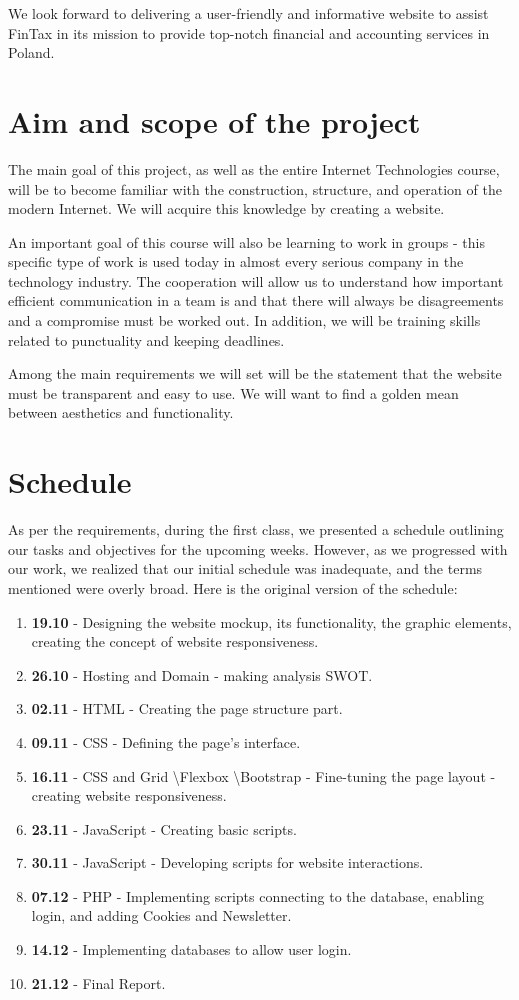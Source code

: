 \documentclass{article}
\begin{document}
We look forward to delivering a user-friendly and informative website to assist FinTax in its mission to provide top-notch financial and accounting services in Poland.
    
    \section{Aim and scope of the project}
The main goal of this project, as well as the entire Internet Technologies course, will be to become familiar with the construction, structure, and operation of the modern Internet. We will acquire this knowledge by creating a website.

An important goal of this course will also be learning to work in groups - this specific type of work is used today in almost every serious company in the technology industry. The cooperation will allow us to understand how important efficient communication in a team is and that there will always be disagreements and a compromise must be worked out. In addition, we will be training skills related to punctuality and keeping deadlines.

Among the main requirements we will set will be the statement that the website must be transparent and easy to use. We will want to find a golden mean between aesthetics and functionality.
    \newpage
    \section{Schedule}
As per the requirements, during the first class, we presented a schedule outlining our tasks and objectives for the upcoming weeks. However, as we progressed with our work, we realized that our initial schedule was inadequate, and the terms mentioned were overly broad. Here is the original version of the schedule:

\begin{enumerate}
    \item \textbf{19.10} - Designing the website mockup, its functionality, the graphic
elements, creating the concept of website responsiveness.
    \item \textbf{26.10} - Hosting and Domain - making analysis SWOT. 
    \item \textbf{02.11} -  HTML - Creating the page structure part.
    \item \textbf{09.11} - CSS - Defining the page's interface.
    \item \textbf{16.11} - CSS and Grid \textbackslash Flexbox \textbackslash Bootstrap - Fine-tuning the page layout - creating website responsiveness.
    \item \textbf{23.11} - JavaScript - Creating basic scripts.
    \item \textbf{30.11} - JavaScript - Developing scripts for website interactions.
    \item \textbf{07.12} - PHP - Implementing scripts connecting to the database, enabling login, and adding Cookies and Newsletter.
    \item \textbf{14.12} - Implementing databases to allow user login.
    \item \textbf{21.12} - Final Report.
\end{enumerate}
\end{document}
